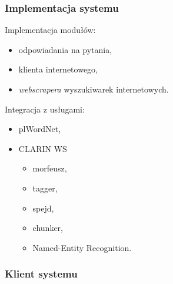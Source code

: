 \documentclass{beamer}
\begin{document}
\begin{frame}
  \frametitle{Implementacja systemu}
  \begin{block}{Implementacja modułów:}
    \begin{itemize}
      \item odpowiadania na pytania,
      \item klienta internetowego,
      \item \textit{webscrapera} wyszukiwarek internetowych.
    \end{itemize}
  \end{block}

  \begin{block}{Integracja z usługami:}
    \begin{itemize}
      \item plWordNet,
      \item CLARIN WS
      \begin{itemize}
        \item morfeusz,
        \item tagger,
        \item spejd,
        \item chunker,
        \item Named-Entity Recognition.
      \end{itemize}
    \end{itemize}
  \end{block}
\end{frame}

\begin{frame}
  \frametitle{Klient systemu} 
  \begin{figure}
    \centering
    \label{fig:klient}
  \end{figure}
\end{frame}
\end{document}
